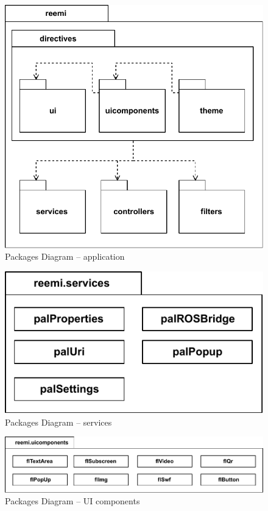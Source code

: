 \begin{figure}[htb]
    \centering
    \includegraphics{figures/design-package-reemi.pdf}
    \caption{Packages Diagram -- application}
    \label{fig:pkg-reemi}
\end{figure}

\begin{figure}[htb]
    \centering
    \includegraphics{figures/design-package-services.pdf}
    \caption{Packages Diagram -- services}
    \label{fig:pkg-services}
\end{figure}

\begin{figure}[htb]
    \centering
    \includegraphics{figures/design-package-uicomponents.pdf}
    \caption{Packages Diagram -- UI components}
    \label{fig:pkg-uicomponents}
\end{figure}

